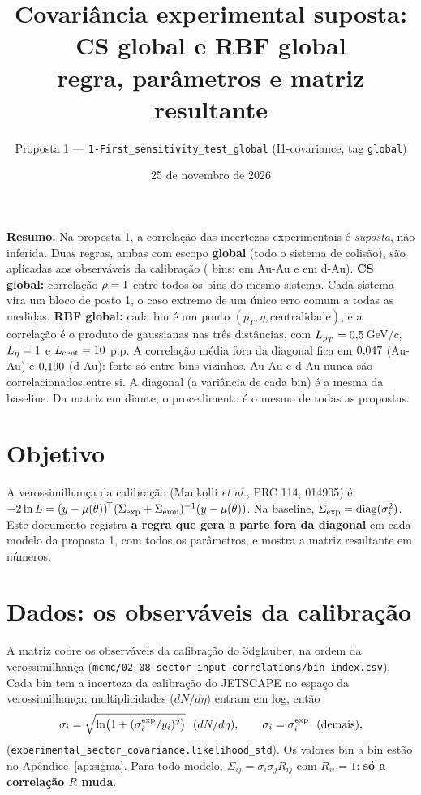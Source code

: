 \documentclass[11pt,a4paper]{article}
\title{Covariância experimental suposta: CS global e RBF global\\
\large regra, parâmetros e matriz resultante}
\date{25 de novembro de 2026}
\author{Proposta 1 --- \texttt{1-First\_sensitivity\_test\_global} \quad (I1-covariance, tag \texttt{global})}
\newcommand{\arq}[1]{\texttt{\nolinkurl{#1}}}
\newcommand{\caixa}[2]{\par\noindent\colorbox{#1}{\parbox{\dimexpr\linewidth-2\fboxsep}{#2}}\par}
\begin{document}
\maketitle
\vspace{-1.5em}

\caixa{blue!6}{\textbf{Resumo.} Na proposta 1, a correlação das incertezas experimentais é \emph{suposta}, não inferida.
Duas regras, ambas com escopo \textbf{global} (todo o sistema de colisão), são aplicadas aos \valNobs{} observáveis da
calibração (\valNbins{} bins: \valNau{} em Au-Au e \valNda{} em d-Au).
\textbf{CS global:} correlação $\rho=1$ entre todos os bins do mesmo sistema. Cada sistema vira um bloco de posto 1,
o caso extremo de um único erro comum a todas as medidas.
\textbf{RBF global:} cada bin é um ponto $(p_T,\eta,\text{centralidade})$, e a correlação é o produto de gaussianas nas
três distâncias, com $L_{p_T}=0{,}5$\,GeV/$c$, $L_\eta=1$ e $L_{\rm cent}=10$ p.p. A correlação média
fora da diagonal fica em $0{,}047$ (Au-Au) e $0{,}190$ (d-Au): forte só entre bins vizinhos.
Au-Au e d-Au nunca são correlacionados entre si. A diagonal (a variância de cada bin) é a mesma da baseline. Da matriz em
diante, o procedimento é o mesmo de todas as propostas.}

\section{Objetivo}
A verossimilhança da calibração (Mankolli \emph{et al.}, PRC 114, 014905) é
$-2\ln L=(y-\mu(\theta))^{\!\top}(\Sigma_{\rm exp}+\Sigma_{\rm emu})^{-1}(y-\mu(\theta))$. Na baseline,
$\Sigma_{\rm exp}={\rm diag}(\sigma_i^2)$. Este documento registra \textbf{a regra que gera a parte fora da diagonal} em
cada modelo da proposta 1, com todos os parâmetros, e mostra a matriz resultante em números.

\section{Dados: os observáveis da calibração}
A matriz cobre os \valNobs{} observáveis da calibração do 3dglauber, na ordem da verossimilhança
(\arq{mcmc/02_08_sector_input_correlations/bin_index.csv}). Cada bin tem a incerteza da calibração do JETSCAPE no espaço
da verossimilhança: multiplicidades ($dN/d\eta$) entram em log, então
\begin{equation}
\sigma_i=\sqrt{\ln\!\big(1+(\sigma^{\rm exp}_i/y_i)^2\big)}\ \ (dN/d\eta),\qquad \sigma_i=\sigma^{\rm exp}_i\ \ (\text{demais}),
\end{equation}
(\arq{experimental_sector_covariance.likelihood_std}). Os valores bin a bin estão no Apêndice~\ref{ap:sigma}. Para todo
modelo, $\Sigma_{ij}=\sigma_i\sigma_j R_{ij}$ com $R_{ii}=1$: \textbf{só a correlação $R$ muda}.
\end{document}
